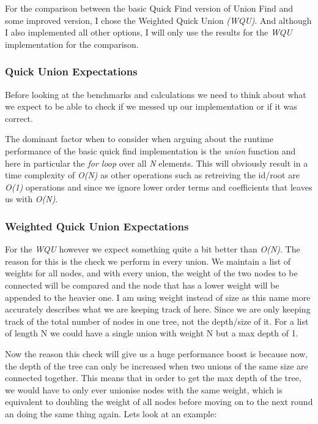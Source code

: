 \documentclass[12pt]{article}
\begin{document}
For the comparison between the basic Quick Find version of Union Find and some improved version,
I chose the Weighted Quick Union \emph{(WQU)}. And although I also implemented all other
options, I will only use the results for the \emph{WQU} implementation for the comparison.

\subsubsection{Quick Union Expectations}

Before looking at the benchmarks and calculations we need to think about what we expect to 
be able to check if we messed up our implementation or if it was correct.

The dominant factor when to consider when arguing about the runtime performance of the 
basic quick find implementation is the \emph{union} function and here in particular the 
\emph{for loop} over all \emph{N} elements. This will obviously result in a time complexity
of \emph{O(N)} as other operations such as retreiving the id/root are \emph{O(1)} operations
and since we ignore lower order terms and coefficients that leaves us with \emph{O(N)}.

\subsubsection{Weighted Quick Union Expectations}

For the \emph{WQU} however we expect something quite a bit better than \emph{O(N)}. The reason
for this is the check we perform in every union. We maintain a list of weights for all nodes,
and with every union, the weight of the two nodes to be connected will be compared and the 
node that has a lower weight will be appended to the heavier one. I am using weight instead
of size as this name more accurately describes what we are keeping track of here. Since we
are only keeping track of the total number of nodes in one tree, not the depth/size of it.
For a list of length N we could have a single union with weight N but a max depth of 1.

Now the reason this check will give us a huge performance boost is because now, the depth
of the tree can only be increased when two unions of the same size are connected together.
This means that in order to get the max depth of the tree, we would have to only ever 
unionise nodes with the same weight, which is equivalent to doubling the weight of all
nodes before moving on to the next round an doing the same thing again. Lets look at an example:
\end{document}
